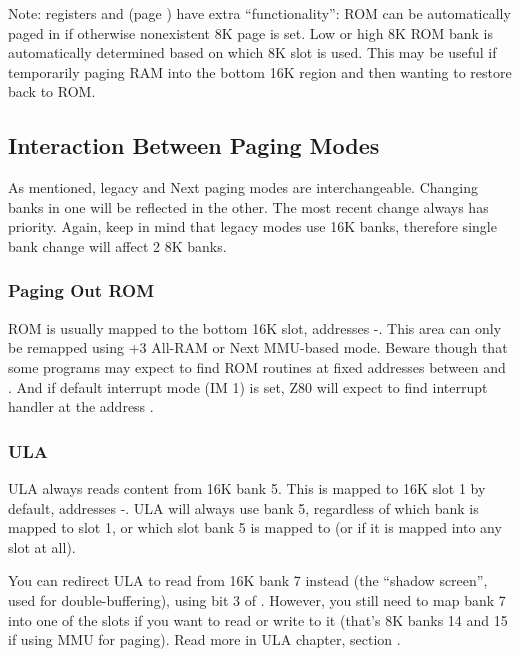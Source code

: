 Note: registers  and  (page ) have extra ``functionality'': ROM can be automatically paged in if otherwise nonexistent 8K page  is set. Low or high 8K ROM bank is automatically determined based on which 8K slot is used. This may be useful if temporarily paging RAM into the bottom 16K region and then wanting to restore back to ROM.


\subsection{Interaction Between Paging Modes}

As mentioned, legacy and Next paging modes are interchangeable. Changing banks in one will be reflected in the other. The most recent change always has priority. Again, keep in mind that legacy modes use 16K banks, therefore single bank change will affect 2 8K banks.


\subsubsection{Paging Out ROM}

ROM is usually mapped to the bottom 16K slot, addresses -. This area can only be remapped using +3 All-RAM or Next MMU-based mode. Beware though that some programs may expect to find ROM routines at fixed addresses between  and . And if default interrupt mode (IM 1) is set, Z80 will expect to find interrupt handler at the address .


\subsubsection{ULA}

ULA always reads content from 16K bank 5. This is mapped to 16K slot 1 by default, addresses -. ULA will always use bank 5, regardless of which bank is mapped to slot 1, or which slot bank 5 is mapped to (or if it is mapped into any slot at all).

You can redirect ULA to read from 16K bank 7 instead (the ``shadow screen'', used for double-buffering), using bit 3 of . However, you still need to map bank 7 into one of the slots if you want to read or write to it (that's 8K banks 14 and 15 if using MMU for paging). Read more in ULA chapter, section .


